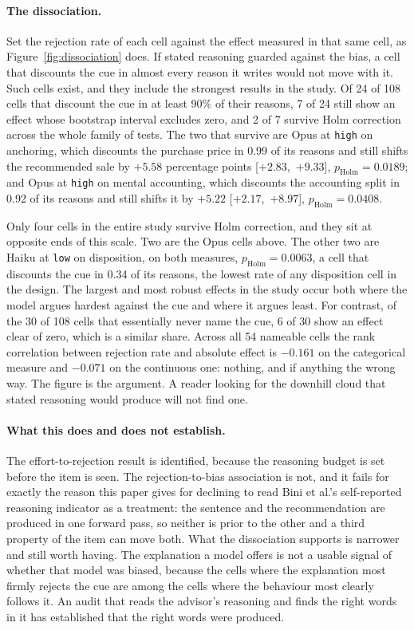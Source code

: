 

\paragraph{The dissociation.} Set the rejection rate of each cell against the
effect measured in that same cell, as Figure~\ref{fig:dissociation} does. If stated reasoning guarded against the
bias, a cell that discounts the cue in almost every reason it writes would
not move with it. Such cells exist, and they include the strongest results in
the study. Of 24 of 108 cells that discount the cue in at least 90\% of their
reasons, 7 of 24 still show an effect whose bootstrap interval excludes zero,
and 2 of 7 survive Holm correction across the whole family of tests. The two
that survive are Opus at \texttt{high} on anchoring, which discounts the
purchase price in 0.99 of its reasons and still shifts the recommended sale
by $+5.58$ percentage points \mbox{[$+2.83$, $+9.33$]}, $p_{\mathrm{Holm}} =
0.0189$; and Opus at \texttt{high} on mental accounting, which discounts the
accounting split in 0.92 of its reasons and still shifts it by $+5.22$
\mbox{[$+2.17$, $+8.97$]}, $p_{\mathrm{Holm}} = 0.0408$.

Only four cells in the entire study survive Holm correction, and they sit at
opposite ends of this scale. Two are the Opus cells above. The other two are
Haiku at \texttt{low} on disposition, on both measures, $p_{\mathrm{Holm}} =
0.0063$, a cell that discounts the cue in 0.34 of its reasons, the lowest
rate of any disposition cell in the design. The largest and most robust
effects in the study occur both where the model argues hardest against the
cue and where it argues least. For contrast, of the 30 of 108 cells that
essentially never name the cue, 6 of 30 show an effect clear of zero, which
is a similar share. Across all 54 nameable cells the rank correlation between
rejection rate and absolute effect is $-0.161$ on the categorical measure and
$-0.071$ on the continuous one: nothing, and if anything the wrong way. The
figure is the argument. A reader looking for the downhill cloud that stated
reasoning would produce will not find one.

\paragraph{What this does and does not establish.} The effort-to-rejection
result is identified, because the reasoning budget is set before the item is
seen. The rejection-to-bias association is not, and it fails for exactly the
reason this paper gives for declining to read Bini et al.'s self-reported
reasoning indicator as a treatment: the sentence and the recommendation are
produced in one forward pass, so neither is prior to the other and a third
property of the item can move both. What the dissociation supports is
narrower and still worth having. The explanation a model offers is not a
usable signal of whether that model was biased, because the cells where the
explanation most firmly rejects the cue are among the cells where the
behaviour most clearly follows it. An audit that reads the advisor's
reasoning and finds the right words in it has established that the right
words were produced.
